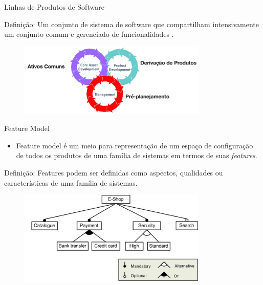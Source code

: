 \begin{frame}{Linhas de Produtos de Software}
    \begin{block}{Definição:}
        Um \alert{conjunto} de sistema de software que \alert{compartilham} intensivamente um \alert{conjunto comum} e gerenciado de funcionalidades \textcolor{Blue}{\cite{Clements2002}}. 
    \end{block}

    \begin{figure}[hbt]
      
      \includegraphics[width=0.8\textwidth]{imagens/atividades-essenciais-1}
    \end{figure}
\end{frame}

\begin{frame}{Feature Model}
    \begin{itemize}
     \item Feature model é um meio para \alert{representação} de um espaço de \alert{configuração} de todos os produtos de 
     uma \alert{família} de sistemas em termos de suas \textit{features}.
    \end{itemize}
    
    \begin{block}{Definição:}
      Features podem ser definidas como \alert{aspectos}, \alert{qualidades} ou \alert{características} de uma \alert{família} de sistemas.
    \end{block}
    
      \begin{figure}[hbt]
      
      \includegraphics[width=0.8\textwidth]{imagens/exemplo-feature-model-1.jpg}
    \end{figure}
\end{frame}

